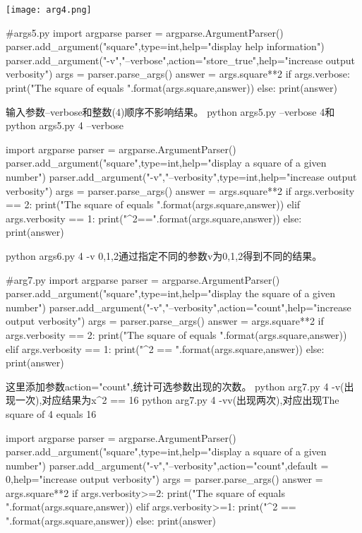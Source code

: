 \texttt{[image: arg4.png]}\newline
\begin{python}
#args5.py
import argparse
parser = argparse.ArgumentParser()
parser.add_argument("square",type=int,help="display help information")
parser.add_argument("-v","--verbose",action="store_true",help="increase output verbosity")
args = parser.parse_args()
answer = args.square**2
if args.verbose:
    print("The square of {} equals {}".format(args.square,answer))
else:
    print(answer)
\end{python}
输入参数--verbose和整数(4)顺序不影响结果。
python args5.py --verbose 4和python args5.py 4 --verbose
\begin{python}
import argparse
parser = argparse.ArgumentParser()
parser.add_argument("square",type=int,help="display a square of a given number")
parser.add_argument("-v","--verbosity",type=int,help="increase output verbosity")
args = parser.parse_args()
answer = args.square**2
if args.verbosity == 2:
    print("The square of {} equals {}".format(args.square,answer))
elif args.verbosity == 1:
    print("{}^2=={}".format(args.square,answer))
else:
    print(answer)
\end{python}
python args6.py 4 -v 0,1,2通过指定不同的参数v为0,1,2得到不同的结果。
\begin{python}
#arg7.py
import argparse
parser = argparse.ArgumentParser()
parser.add_argument("square",type=int,help="display the square of a given number")
parser.add_argument("-v","--verbosity",action="count",help="increase output verbosity")
args = parser.parse_args()
answer = args.square**2
if args.verbosity == 2:
    print("The square of {} equals {}".format(args.square,answer))
elif args.verbosity == 1:
    print("{}^2 == {}".format(args.square,answer))
else:
    print(answer)
\end{python}
这里添加参数action="count",统计可选参数出现的次数。
python arg7.py 4 -v(出现一次),对应结果为x\^{}2 == 16\newline
python arg7.py 4 -vv(出现两次),对应出现The square of 4 equals 16\newline
\begin{python}
import argparse
parser = argparse.ArgumentParser()
parser.add_argument("square",type=int,help="display a square of a given number")
parser.add_argument("-v","--verbosity",action="count",default = 0,help="increase output verbosity")
args = parser.parse_args()
answer = args.square**2
if args.verbosity>=2:
    print("The square of {} equals {}".format(args.square,answer))
elif args.verbosity>=1:
    print("{}^2 == {}".format(args.square,answer))
else:
    print(answer)
\end{python}
